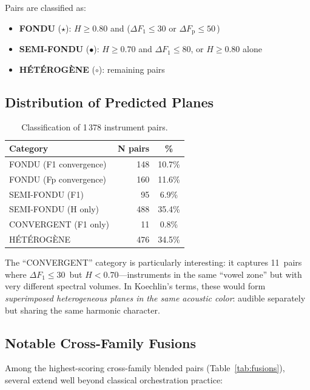 \documentclass[journal]{IEEEtran}
\newcommand{\Fp}{F_\mathrm{p}}
\newcommand{\Hz}{\,\text{Hz}}
\begin{document}
Pairs are classified as:
\begin{itemize}[nosep]
\item \textbf{FONDU} ($\star$): $H \geq 0.80$ and ($\Delta F_1 \leq 30$ or $\Delta\Fp \leq 50$\Hz)
\item \textbf{SEMI-FONDU} ($\bullet$): $H \geq 0.70$ and $\Delta F_1 \leq 80$, or $H \geq 0.80$ alone
\item \textbf{H\'ET\'EROG\`ENE} ($\circ$): remaining pairs
\end{itemize}

\subsection{Distribution of Predicted Planes}

\begin{table}[!t]
\centering
\caption{Classification of 1\,378 instrument pairs.}
\label{tab:planes}
\begin{tabular}{@{}lrc@{}}
\toprule
\textbf{Category} & \textbf{N pairs} & \textbf{\%} \\
\midrule
FONDU (F1 convergence)      & 148 & 10.7\% \\
FONDU (Fp convergence)      & 160 & 11.6\% \\
SEMI-FONDU (F1)             &  95 &  6.9\% \\
SEMI-FONDU (H only)         & 488 & 35.4\% \\
CONVERGENT (F1 only)        &  11 &  0.8\% \\
HÉTÉROGÈNE                  & 476 & 34.5\% \\
\bottomrule
\end{tabular}
\end{table}

The ``CONVERGENT'' category is particularly interesting: it captures 11~pairs where $\Delta F_1 \leq 30$\Hz{} but $H < 0.70$---instruments in the same ``vowel zone'' but with very different spectral volumes. In Koechlin's terms, these would form \textit{superimposed heterogeneous planes in the same acoustic color}: audible separately but sharing the same harmonic character.

\subsection{Notable Cross-Family Fusions}

Among the highest-scoring cross-family blended pairs (Table~\ref{tab:fusions}), several extend well beyond classical orchestration practice:
\end{document}
